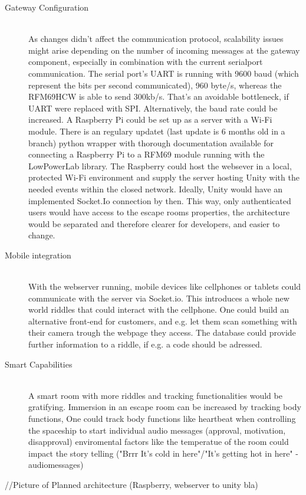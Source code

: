 \begin{description}
    \item[Gateway Configuration]\hfill \\
    As changes didn't affect the communication protocol, scalability issues might arise depending on the number of incoming messages at the gateway component, 
    especially in combination with the current serialport communication. 
    The serial port's UART is running with 9600 baud (which represent the bits per second communicated), 
    960 byte/s, whereas the RFM69HCW is able to send 300kb/s. 
    That's an avoidable bottleneck, if UART were replaced with SPI.
    Alternatively, the baud rate could be increased.
    A Raspberry Pi could be set up as a server with a Wi-Fi module. 
    There is an regulary updatet (last update is 6 months old in a branch) python wrapper \parencite{raspberrypiLibRFM} with thorough documentation \parencite{raspberrypiDoc} available for connecting 
    a Raspberry Pi to a RFM69 module running with the LowPowerLab library. 
    The Raspberry could host the websever in a local, protected Wi-Fi environment and 
    supply the server hosting Unity with the needed events within the closed network. 
    Ideally, Unity would have an implemented Socket.Io connection by then.
    This way, only authenticated users would have access to the escape rooms properties, 
    the architecture would be separated and therefore clearer for developers, and easier to change.
     \parencite{raspberrypiDoc}
     \item[Mobile integration]\hfill \\
     With the webserver running, mobile devices like cellphones or tablets could communicate with the server via Socket.io. 
     This introduces a whole new world riddles that could interact with the cellphone. 
     One could build an alternative front-end for customers, and e.g.
     let them scan something with their camera trough the webpage they access.
     The database could provide further information to a riddle, if e.g. a code should be adressed.
     \item[Smart Capabilities]\hfill \\
     A smart room with more riddles and tracking functionalities would be gratifying.
     Immersion in an escape room can be increased by tracking body functions,
     One could track body functions like heartbeat when controlling 
     the spaceship to start individual audio messages (approval, motivation, disapproval)
     enviromental factors like the temperatue of the room could impact the story telling ("Brrr It's cold in here"/"It's getting hot in here" - audiomessages)


\end{description}
//Picture of Planned architecture (Raspberry, webserver to unity bla)

